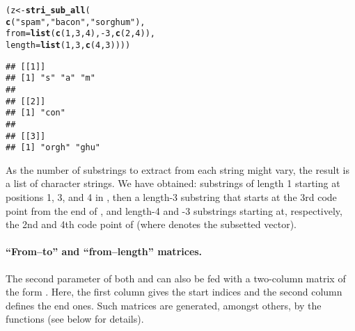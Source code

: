 \documentclass[nojss]{jss}\usepackage[]{graphicx}\usepackage[]{xcolor}
\makeatletter
\newcommand{\hlnum}[1]{\textcolor[rgb]{0.686,0.059,0.569}{#1}}%
\newcommand{\hlstr}[1]{\textcolor[rgb]{0.192,0.494,0.8}{#1}}%
\newcommand{\hlopt}[1]{\textcolor[rgb]{0,0,0}{#1}}%
\newcommand{\hlstd}[1]{\textcolor[rgb]{0.345,0.345,0.345}{#1}}%
\newcommand{\hlkwb}[1]{\textcolor[rgb]{0.69,0.353,0.396}{#1}}%
\newcommand{\hlkwc}[1]{\textcolor[rgb]{0.333,0.667,0.333}{#1}}%
\newcommand{\hlkwd}[1]{\textcolor[rgb]{0.737,0.353,0.396}{\textbf{#1}}}%
\newenvironment{kframe}{%
 \def\at@end@of@kframe{}%
 \ifinner\ifhmode%
  \def\at@end@of@kframe{\end{minipage}}%
  \begin{minipage}{\columnwidth}%
 \fi\fi%
 \def\FrameCommand##1{\hskip\@totalleftmargin \hskip-\fboxsep
 \colorbox{shadecolor}{##1}\hskip-\fboxsep
     \hskip-\linewidth \hskip-\@totalleftmargin \hskip\columnwidth}%
 \MakeFramed {\advance\hsize-\width
   \@totalleftmargin\z@ \linewidth\hsize
   \@setminipage}}%
 {\par\unskip\endMakeFramed%
 \at@end@of@kframe}
\newenvironment{knitrout}{}{} %
\makeatother
\begin{document}
\begin{knitrout}
\color{fgcolor}\begin{kframe}
\begin{alltt}
\hlstd{(z} \hlkwb{<-} \hlkwd{stri_sub_all}\hlstd{(}
              \hlkwd{c}\hlstd{(}\hlstr{"spam"}\hlstd{,}     \hlstr{"bacon"}\hlstd{,} \hlstr{"sorghum"}\hlstd{),}
  \hlkwc{from}   \hlstd{=} \hlkwd{list}\hlstd{(}\hlkwd{c}\hlstd{(}\hlnum{1}\hlstd{,} \hlnum{3}\hlstd{,} \hlnum{4}\hlstd{),} \hlopt{-}\hlnum{3}\hlstd{,}      \hlkwd{c}\hlstd{(}\hlnum{2}\hlstd{,} \hlnum{4}\hlstd{)),}
  \hlkwc{length} \hlstd{=} \hlkwd{list}\hlstd{(}\hlnum{1}\hlstd{,}           \hlnum{3}\hlstd{,}      \hlkwd{c}\hlstd{(}\hlnum{4}\hlstd{,} \hlnum{3}\hlstd{))))}
\end{alltt}
\begin{verbatim}
## [[1]]
## [1] "s" "a" "m"
## 
## [[2]]
## [1] "con"
## 
## [[3]]
## [1] "orgh" "ghu"
\end{verbatim}
\end{kframe}
\end{knitrout}

As the number of substrings to extract from each string might vary,
the result is a list of character strings.
We have obtained:
substrings of length 1 starting at positions 1, 3, and 4 in ,
then a length-3 substring that starts at the 3rd code point
from the end of ,
and length-4 and -3 substrings starting at, respectively,
the 2nd and 4th code point
of  (where  denotes the subsetted vector).











\paragraph{``From--to'' and ``from--length'' matrices.}
The second parameter of both  and 
can also be fed with a two-column matrix
of the form . Here, the first column
gives the start indices and the second column defines the end ones.
Such matrices are generated, amongst others, by the 
functions (see below for details).
\end{document}
